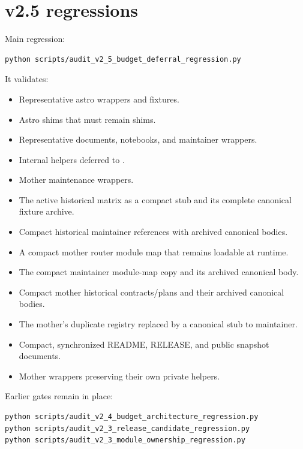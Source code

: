 \documentclass[11pt,a4paper]{article}
\newcommand{\code}[1]{\texttt{\detokenize{#1}}}
\begin{document}
\section{v2.5 regressions}
Main regression:
\begin{lstlisting}[style=promptstyle]
python scripts/audit_v2_5_budget_deferral_regression.py
\end{lstlisting}
It validates:
\begin{itemize}[leftmargin=1.5em]
\item Representative astro wrappers and fixtures.
\item Astro shims that must remain shims.
\item Representative documents, notebooks, and maintainer wrappers.
\item Internal helpers deferred to \code{fixtures/_internal/}.
\item Mother maintenance wrappers.
\item The active historical matrix as a compact stub and its complete canonical fixture archive.
\item Compact historical maintainer references with archived canonical bodies.
\item A compact mother router module map that remains loadable at runtime.
\item The compact maintainer module-map copy and its archived canonical body.
\item Compact mother historical contracts/plans and their archived canonical bodies.
\item The mother's duplicate registry replaced by a canonical stub to maintainer.
\item Compact, synchronized README, RELEASE, and public snapshot documents.
\item Mother wrappers preserving their own private helpers.
\end{itemize}
Earlier gates remain in place:
\begin{lstlisting}[style=promptstyle]
python scripts/audit_v2_4_budget_architecture_regression.py
python scripts/audit_v2_3_release_candidate_regression.py
python scripts/audit_v2_3_module_ownership_regression.py
\end{lstlisting}
\end{document}
